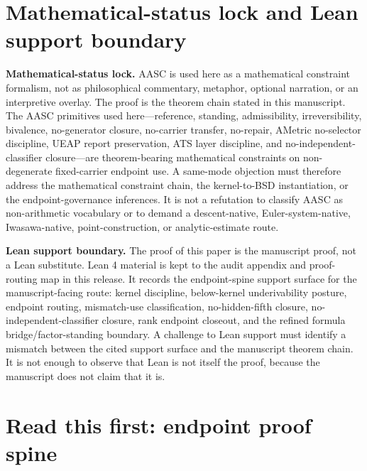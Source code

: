 \documentclass[11pt]{article}
\begin{document}
\section*{Mathematical-status lock and Lean support boundary}
\textbf{Mathematical-status lock.} AASC is used here as a mathematical constraint formalism, not as philosophical commentary, metaphor, optional narration, or an interpretive overlay. The proof is the theorem chain stated in this manuscript. The AASC primitives used here---reference, standing, admissibility, irreversibility, bivalence, no-generator closure, no-carrier transfer, no-repair, AMetric no-selector discipline, UEAP report preservation, ATS layer discipline, and no-independent-classifier closure---are theorem-bearing mathematical constraints on non-degenerate fixed-carrier endpoint use. A same-mode objection must therefore address the mathematical constraint chain, the kernel-to-BSD instantiation, or the endpoint-governance inferences. It is not a refutation to classify AASC as non-arithmetic vocabulary or to demand a descent-native, Euler-system-native, Iwasawa-native, point-construction, or analytic-estimate route.

\textbf{Lean support boundary.} The proof of this paper is the manuscript proof, not a Lean substitute. Lean 4 material is kept to the audit appendix and proof-routing map in this release. It records the endpoint-spine support surface for the manuscript-facing route: kernel discipline, below-kernel underivability posture, endpoint routing, mismatch-use classification, no-hidden-fifth closure, no-independent-classifier closure, rank endpoint closeout, and the refined formula bridge/factor-standing boundary. A challenge to Lean support must identify a mismatch between the cited support surface and the manuscript theorem chain. It is not enough to observe that Lean is not itself the proof, because the manuscript does not claim that it is.

\tableofcontents
\newpage

\section*{Read this first: endpoint proof spine}
\end{document}
